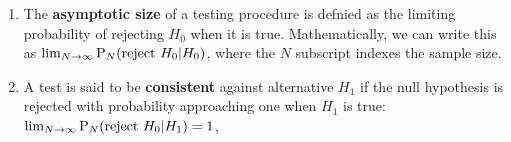 \documentclass[11pt, oneside, a4paper, article]{article}
\numberwithin{equation}{section}
\begin{document}
\begin{defn} 
\item
\begin{enumerate}
\item
The \textbf{asymptotic size} of a testing procedure is defnied as the limiting probability of rejecting $H_{0}$ when it is true.
Mathematically, we can write this as 
$\lim_{N \to \infty} \text{P}_{N}(\text{reject } H_{0} | H_{0})$,
where the $N$ subscript indexes the sample size.

\item
A test is said to be \textbf{consistent} against alternative $H_{1}$ if the null hypothesis is rejected with probability approaching one when $H_{1}$ is true:
$\lim_{N \to \infty} \text{P}_{N}(\text{reject } H_{0} | H_{1}) = 1$,
\end{enumerate}

\end{defn}
\end{document}

